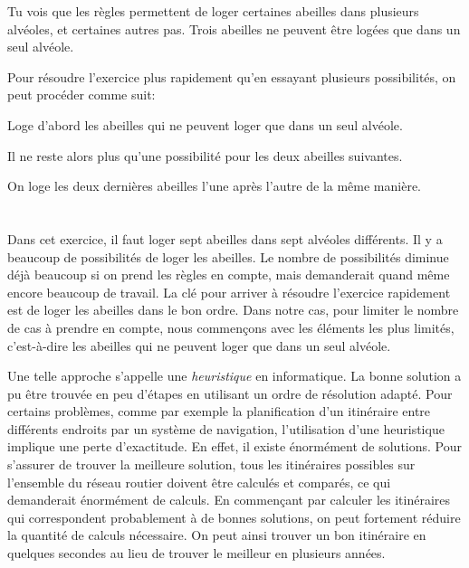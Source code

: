 {{{\centering%
\par}

Tu vois que les règles permettent de loger certaines abeilles dans plusieurs alvéoles, et certaines autres pas. Trois abeilles ne peuvent être logées que dans un seul alvéole.

Pour résoudre l’exercice plus rapidement qu’en essayant plusieurs possibilités, on peut procéder comme suit:

Loge d’abord les abeilles qui ne peuvent loger que dans un seul alvéole.

{\centering%
\par}

Il ne reste alors plus qu’une possibilité pour les deux abeilles suivantes.

{\centering%
\par}

On loge les deux dernières abeilles l’une après l’autre de la même manière.



\section*{\BrochureItsInformatics}
Dans cet exercice, il faut loger sept abeilles dans sept alvéoles différents. Il y a beaucoup de possibilités de loger les abeilles. Le nombre de possibilités diminue déjà beaucoup si on prend les règles en compte, mais demanderait quand même encore beaucoup de travail. La clé pour arriver à résoudre l’exercice rapidement est de loger les abeilles dans le bon ordre. Dans notre cas, pour limiter le nombre de cas à prendre en compte, nous commençons avec les éléments les plus limités, c’est-à-dire les abeilles qui ne peuvent loger que dans un seul alvéole.

Une telle approche s’appelle une \emph{heuristique} en informatique. La bonne solution a pu être trouvée en peu d’étapes en utilisant un ordre de résolution adapté. Pour certains problèmes, comme par exemple la planification d’un itinéraire entre différents endroits par un système de navigation, l’utilisation d’une heuristique implique une perte d’exactitude. En effet, il existe énormément de solutions. Pour s’assurer de trouver la meilleure solution, tous les itinéraires possibles sur l’ensemble du réseau routier doivent être calculés et comparés, ce qui demanderait énormément de calculs. En commençant par calculer les itinéraires qui correspondent probablement à de bonnes solutions, on peut fortement réduire la quantité de calculs nécessaire. On peut ainsi trouver un bon itinéraire en quelques secondes au lieu de trouver le meilleur en plusieurs années.



}}
